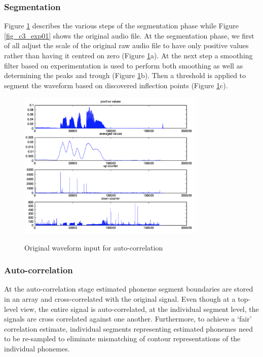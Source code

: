 \subsubsection{Segmentation}
Figure \ref{fig_c3_exp02} describes the various steps of the segmentation phase while Figure \ref{fig_c3_exp01} shows the original audio file. At the segmentation phase, we first of all adjust the scale of the original raw audio file to have only positive values rather than having it centred on zero (Figure \ref{fig_c3_exp02}a).  At the next step a smoothing filter based on experimentation is used to perform both smoothing as well as determining the peaks and trough (Figure \ref{fig_c3_exp02}b).  Then a threshold is applied to segment the waveform based on discovered inflection points (Figure \ref{fig_c3_exp02}c).  
\begin{figure}
\centering
  \includegraphics[width=9cm]{thesis/images/corr00}\\
  \caption{Original waveform input for auto-correlation}\label{fig_c3_exp02}
\end{figure}
\subsubsection{Auto-correlation}
At the auto-correlation stage estimated phoneme segment boundaries are stored in an array and cross-correlated with the original signal.  Even though at a top-level view, the entire signal is auto-correlated, at the individual segment level, the signals are cross correlated against one another.  Furthermore, to achieve a ‘fair’ correlation estimate, individual segments representing estimated phonemes need to be re-sampled to eliminate mismatching of contour representations of the individual phonemes.


